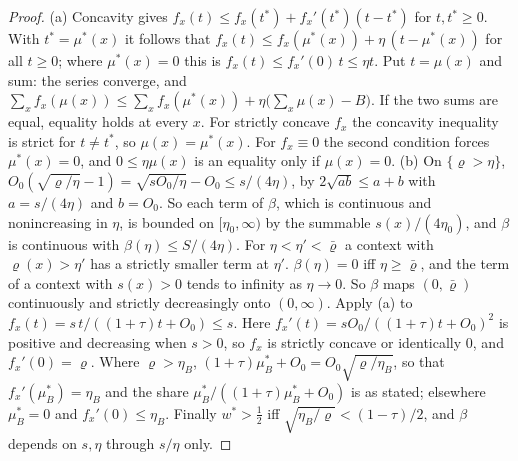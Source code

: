 \begin{proof}
(a) Concavity gives $f_x(t)\le f_x(t^*)+f_x'(t^*)(t-t^*)$ for $t,t^*\ge0$. With $t^*=\mu^*(x)$ it follows that
$f_x(t)\le f_x(\mu^*(x))+\eta\,(t-\mu^*(x))$ for all $t\ge0$; where $\mu^*(x)=0$ this is $f_x(t)\le
f_x'(0)\,t\le\eta t$. Put $t=\mu(x)$ and sum: the series converge, and
$\sum_xf_x(\mu(x))\le\sum_xf_x(\mu^*(x))+\eta\bigl(\sum_x\mu(x)-B\bigr)$. If the two sums are equal, equality
holds at every $x$. For strictly concave $f_x$ the concavity inequality is strict for $t\ne t^*$, so
$\mu(x)=\mu^*(x)$. For $f_x\equiv0$ the second condition forces $\mu^*(x)=0$, and $0\le\eta\mu(x)$ is an
equality only if $\mu(x)=0$. (b) On $\{\varrho>\eta\}$, $O_0(\sqrt{\varrho/\eta}-1)=\sqrt{sO_0/\eta}-O_0\le
s/(4\eta)$, by $2\sqrt{ab}\le a+b$ with $a=s/(4\eta)$ and $b=O_0$. So each term of $\beta$, which is
continuous and nonincreasing in $\eta$, is bounded on $[\eta_0,\infty)$ by the summable $s(x)/(4\eta_0)$, and
$\beta$ is continuous with $\beta(\eta)\le S/(4\eta)$. For $\eta<\eta'<\bar\varrho$ a context with
$\varrho(x)>\eta'$ has a strictly smaller term at $\eta'$. $\beta(\eta)=0$ iff $\eta\ge\bar\varrho$, and the
term of a context with $s(x)>0$ tends to infinity as $\eta\to0$. So $\beta$ maps $(0,\bar\varrho)$
continuously and strictly decreasingly onto $(0,\infty)$. Apply (a) to $f_x(t)=s\,t/((1+\tau)t+O_0)\le s$.
Here $f_x'(t)=sO_0/((1+\tau)t+O_0)^2$ is positive and decreasing when $s>0$, so $f_x$ is strictly concave or
identically $0$, and $f_x'(0)=\varrho$. Where $\varrho>\eta_B$,
$(1+\tau)\mu^*_B+O_0=O_0\sqrt{\varrho/\eta_B}$, so that $f_x'(\mu^*_B)=\eta_B$ and the share
$\mu^*_B/((1+\tau)\mu^*_B+O_0)$ is as stated; elsewhere $\mu^*_B=0$ and $f_x'(0)\le\eta_B$. Finally
$w^*>\frac12$ iff $\sqrt{\eta_B/\varrho}<(1-\tau)/2$, and $\beta$ depends on $s,\eta$ through $s/\eta$ only.
\end{proof}

